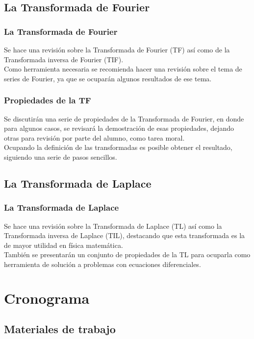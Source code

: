 \documentclass[12pt]{beamer}
\begin{document}
\subsection{La Transformada de Fourier}

\begin{frame}
\frametitle{La Transformada de Fourier}
Se hace una revisión sobre la Transformada de Fourier (TF) así como de la Transformada inversa de Fourier (TIF).
\\
\bigskip
\pause
Como herramienta necesaria se recomienda hacer una revisión sobre el tema de series de Fourier, ya que se ocuparán algunos resultados de ese tema.
\end{frame}
\begin{frame}
\frametitle{Propiedades de la TF}
Se discutirán una serie de propiedades de la Transformada de Fourier, en donde para algunos casos, se revisará la demostración de esas propiedades, dejando otras para revisión por parte del alumno, como tarea moral.
\\
\bigskip
\pause
Ocupando la definición de las transformadas es posible obtener el resultado, siguiendo una serie de pasos sencillos.
\end{frame}

\subsection{La Transformada de Laplace}

\begin{frame}
\frametitle{La Transformada de Laplace}
Se hace una revisión sobre la Transformada de Laplace (TL) así como la Transformada inversa de Laplace (TIL), destacando que esta transformada es la de mayor utilidad en física matemática.
\\
\bigskip
\pause
También se presentarán un conjunto de propiedades de la TL para ocuparla como herramienta de solución a problemas con ecuaciones diferenciales.
\end{frame}

\section{Cronograma}
\subsection{Materiales de trabajo}
\end{document}
